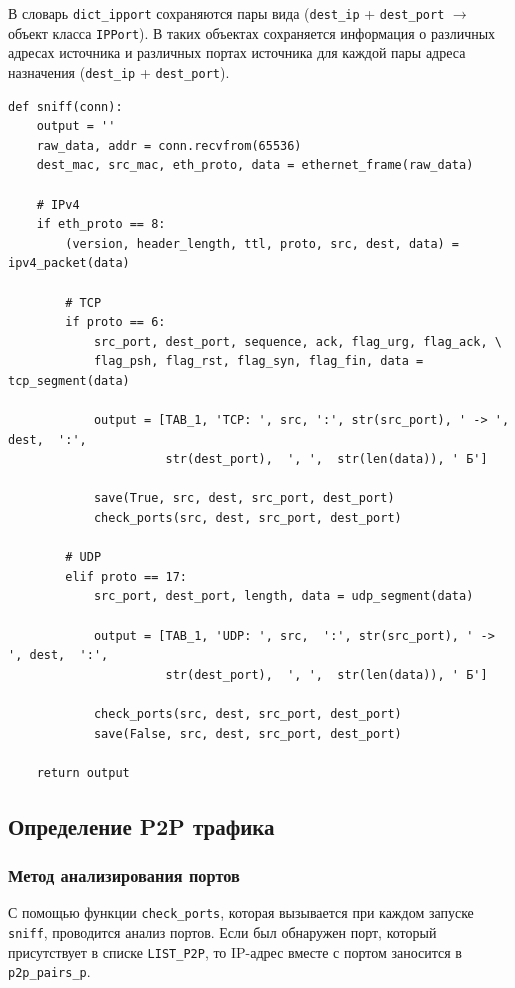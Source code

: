 \documentclass[bachelor, och, coursework]{SCWorks}
\begin{document}
В словарь \texttt{dict_ipport} сохраняются пары вида (\texttt{dest_ip} + \texttt{dest_port} $\to$ объект класса \texttt{IPPort}). 
В таких объектах сохраняется информация о различных адресах источника и различных портах источника для каждой пары адреса назначения (\texttt{dest_ip} + \texttt{dest_port}).

\begin{verbatim}
def sniff(conn):
    output = ''
    raw_data, addr = conn.recvfrom(65536)
    dest_mac, src_mac, eth_proto, data = ethernet_frame(raw_data)

    # IPv4
    if eth_proto == 8:
        (version, header_length, ttl, proto, src, dest, data) = ipv4_packet(data)

        # TCP
        if proto == 6:
            src_port, dest_port, sequence, ack, flag_urg, flag_ack, \
            flag_psh, flag_rst, flag_syn, flag_fin, data = tcp_segment(data)

            output = [TAB_1, 'TCP: ', src, ':', str(src_port), ' -> ', dest,  ':',
                      str(dest_port),  ', ',  str(len(data)), ' Б']

            save(True, src, dest, src_port, dest_port)
            check_ports(src, dest, src_port, dest_port)

        # UDP
        elif proto == 17:
            src_port, dest_port, length, data = udp_segment(data)

            output = [TAB_1, 'UDP: ', src,  ':', str(src_port), ' -> ', dest,  ':',
                      str(dest_port),  ', ',  str(len(data)), ' Б']

            check_ports(src, dest, src_port, dest_port)
            save(False, src, dest, src_port, dest_port)

    return output
\end{verbatim}

\subsection{Определение P2P трафика}
\subsubsection{Метод анализирования портов}
С помощью функции \texttt{check_ports}, которая вызывается при каждом запуске \texttt{sniff}, проводится анализ портов. 
Если был обнаружен порт, который присутствует в списке \texttt{LIST_P2P}, то IP-адрес вместе с портом заносится в \texttt{p2p_pairs_p}.
\end{document}
